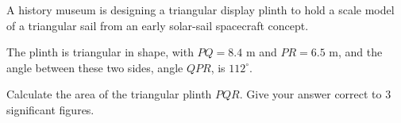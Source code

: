 \begin{question}
\noindent A history museum is designing a triangular display plinth to hold a scale model of a triangular sail from an early solar-sail spacecraft concept.

The plinth is triangular in shape, with $PQ = 8.4$ m and $PR = 6.5$ m, and the angle between these two sides, angle $QPR$, is $112^\circ$.

\begin{center}
\end{center}

\noindent Calculate the area of the triangular plinth $PQR$.
Give your answer correct to 3 significant figures.

\vspace{4.5cm}

\begin{flushright}
\end{flushright}
\end{question}

